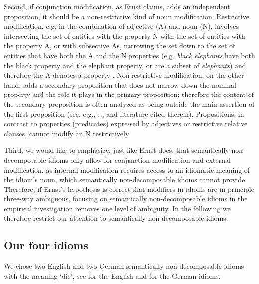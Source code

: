 \documentclass[output=paper]{langsci/langscibook}
\begin{document}
\begin{sloppypar}
  Second, if conjunction modification, as Ernst claims, adds an
  independent prop\-osition, it should be a non-restrictive kind of
  noun modification. Restrictive modification, e.g. in the combination
  of adjective (A) and noun (N), involves intersecting the set of
  entities with the property N with the set of entities with the
  property A, or with subsective As, narrowing the set down to the set
  of entities that have both the A and the N properties
  (e.g. \textit{black elephants} have both the black property and the
  elephant property, or are a subset of \textit{elephants}) and
  therefore the A denotes a property \citep[see,
  e.g.,][]{kamppartee}. Non-restrictive modification, on the other
  hand, adds a secondary proposition that does not narrow down the
  nominal property and the role it plays in the primary proposition;
  therefore the content of the secondary proposition is often analyzed
  as being outside the main assertion of the first
  proposition %
  (see, e.g., \citealt{morzyckibook}; \citealt{mcnally16}; and
  literature cited therein). Propositions, in contrast to properties
  (predicates) expressed by adjectives or restrictive relative
  clauses, cannot modify an N restrictively.
\end{sloppypar}
Third, we would like to emphasize, just like Ernst does, that semantically non-decomposable idioms only allow for conjunction modification and external modification, as internal modification requires access to an idiomatic meaning of the idiom's noun, which semantically non-decomposable idioms cannot provide. Therefore, if Ernst's hypothesis is correct that modifiers in idioms are in principle three-way ambiguous, focusing on semantically non-decomposable idioms in the empirical investigation removes one level of ambiguity. In the following we therefore restrict our attention to semantically non-decomposable idioms. 
\vspace{10pt}


\subsection{Our four idioms} \label{our four idioms}

We chose two English and two German semantically non-decomposable idioms with the meaning `die', see  for the English and  for the German idioms. 
\end{document}
